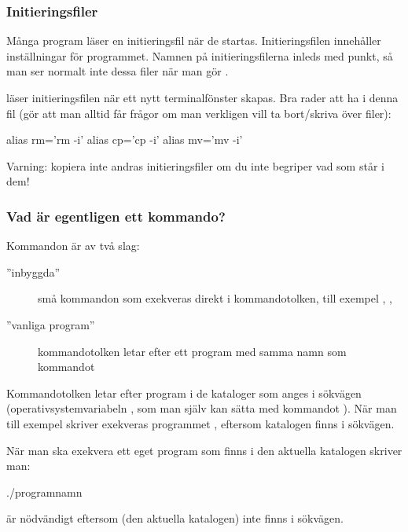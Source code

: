 \begin{frame}[fragile=singleslide]
    \frametitle{Initieringsfiler}
    Många program läser en initieringsfil när de startas. Initieringsfilen innehåller inställningar för programmet. Namnen på initieringsfilerna inleds med punkt, så man ser normalt inte dessa filer när man gör .

    \pindent {} läser initieringsfilen  när ett nytt terminalfönster skapas. Bra rader att ha i denna fil (gör att man alltid får frågor om man verkligen vill ta bort/skriva över filer):

    \begin{Code}
        alias rm='rm -i'
        alias cp='cp -i'
        alias mv='mv -i'
    \end{Code}

    Varning: kopiera inte andras initieringsfiler om du inte begriper vad som står i dem!
\end{frame}

\begin{frame}[fragile=singleslide]
    \frametitle{Vad är egentligen ett kommando?}
    Kommandon är av två slag:

    \begin{description}
        \item[''inbyggda''] små kommandon som exekveras direkt i kommandotolken, till exempel , , 
        \item[''vanliga program''] kommandotolken letar efter ett program med samma namn som kommandot
    \end{description}

    Kommandotolken letar efter program i de kataloger som anges i sökvägen (operativsystemvariabeln , som man själv kan sätta med kommandot ). När man till exempel skriver  exekveras programmet , eftersom katalogen  finns i sökvägen.

    \pindent När man ska exekvera ett eget program som finns i den aktuella katalogen skriver man:
    \begin{Code}
        ./programnamn
    \end{Code}

     är nödvändigt eftersom  (den aktuella katalogen) inte finns i sökvägen.
\end{frame}

